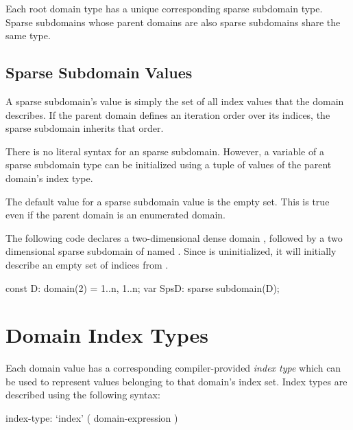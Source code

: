 Each root domain type has a unique corresponding sparse subdomain
type.  Sparse subdomains whose parent domains are also sparse
subdomains share the same type.

\subsection{Sparse Subdomain Values}
\label{Sparse_Domain_Values}

A sparse subdomain's value is simply the set of all index values that
the domain describes.  If the parent domain defines an iteration order
over its indices, the sparse subdomain inherits that order.

There is no literal syntax for an sparse subdomain.  However, a variable of a
sparse subdomain type can be initialized using a tuple of values
of the parent domain's index type.

The default value for a sparse subdomain value is the empty set.  This is true
even if the parent domain is an enumerated domain.

\begin{example}
The following code declares a two-dimensional dense domain ,
followed by a two dimensional sparse subdomain of 
named .  Since  is uninitialized, it will
initially describe an empty set of indices from .
\begin{chapel}
const D: domain(2) = {1..n, 1..n};
var SpsD: sparse subdomain(D);
\end{chapel}
\end{example}

\section{Domain Index Types}
\label{Index_Types}

Each domain value has a corresponding compiler-provided \emph{index
type} which can be used to represent values belonging to that domain's
index set.  Index types are described using the following syntax:

\begin{syntax}
index-type:
  `index' ( domain-expression )
\end{syntax}

